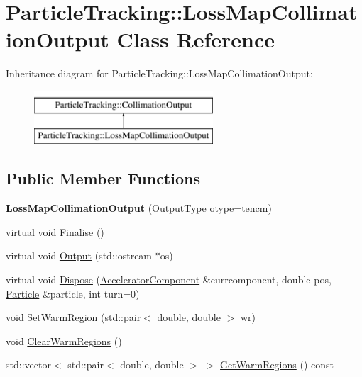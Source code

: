 \hypertarget{classParticleTracking_1_1LossMapCollimationOutput}{}\section{Particle\+Tracking\+:\+:Loss\+Map\+Collimation\+Output Class Reference}
\label{classParticleTracking_1_1LossMapCollimationOutput}
Inheritance diagram for Particle\+Tracking\+:\+:Loss\+Map\+Collimation\+Output\+:\begin{figure}[H]
\begin{center}
\leavevmode
\includegraphics[height=2.000000cm]{classParticleTracking_1_1LossMapCollimationOutput}
\end{center}
\end{figure}
\subsection*{Public Member Functions}
\begin{DoxyCompactItemize}
\item 
\mbox{\label{classParticleTracking_1_1LossMapCollimationOutput_abf296e24d81dee21cd1ed8024aadeb3b}} 
{\bfseries Loss\+Map\+Collimation\+Output} (Output\+Type otype=tencm)
\item 
virtual void \hyperlink{classParticleTracking_1_1LossMapCollimationOutput_a74a6bede8d155ab85825132d4b4e5b62}{Finalise} ()
\item 
virtual void \hyperlink{classParticleTracking_1_1LossMapCollimationOutput_a9e630f3568cc66c134720f72aa8bb7a4}{Output} (std\+::ostream $\ast$os)
\item 
virtual void \hyperlink{classParticleTracking_1_1LossMapCollimationOutput_af4f4453bf26750dff5f8dc9ba1862583}{Dispose} (\hyperlink{classAcceleratorComponent}{Accelerator\+Component} \&currcomponent, double pos, \hyperlink{classPSvector}{Particle} \&particle, int turn=0)
\item 
void \hyperlink{classParticleTracking_1_1LossMapCollimationOutput_a14471490bc642f45166fc024d7d80be9}{Set\+Warm\+Region} (std\+::pair$<$ double, double $>$ wr)
\item 
void \hyperlink{classParticleTracking_1_1LossMapCollimationOutput_a9e2316935bced564a8a8d83763ac23cd}{Clear\+Warm\+Regions} ()
\item 
std\+::vector$<$ std\+::pair$<$ double, double $>$ $>$ \hyperlink{classParticleTracking_1_1LossMapCollimationOutput_a0545aef555f123f8a94cd33af807e346}{Get\+Warm\+Regions} () const
\end{DoxyCompactItemize}
